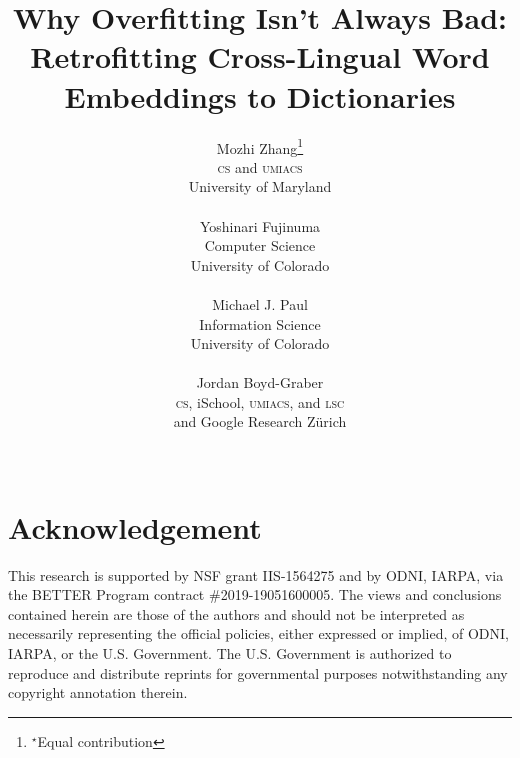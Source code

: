 \documentclass[11pt,a4paper]{article}
\title{Why Overfitting Isn't Always Bad: \\
Retrofitting Cross-Lingual Word Embeddings to Dictionaries}
\author{Mozhi Zhang\thanks{$^\star$Equal contribution} \\
  \textsc{cs} and \textsc{umiacs} \\
  University of Maryland \\
  \emaillink{mozhi@cs.umd.edu} \\\And
  Yoshinari Fujinuma\footnotemark[1] \\
  Computer Science \\
  University of Colorado \\
  \emaillink{fujinumay@gmail.com} \\\AND
  Michael J. Paul \\
  Information Science \\
  University of Colorado \\
  \emaillink{mpaul@colorado.edu} \\\And
  Jordan Boyd-Graber \\
  \abr{umd} \textsc{cs}, iSchool, \textsc{umiacs}, and \textsc{lsc}  \\
  and Google Research Z\"urich \\
  \emaillink{jbg@boydgraber.org} \\}
\date{}
\newcommand{\latexfile}[1]{}
\begin{document}
\maketitle
\begin{abstract}
  \latexfile{00-abstract}
\end{abstract}

\latexfile{10-intro}
\latexfile{20-clwe}
\latexfile{30-retrofit}
\latexfile{40-experiment}
\latexfile{50-related_work}
\latexfile{60-conclusion}

\section*{Acknowledgement}

This research is supported by NSF grant IIS-1564275 and by ODNI, IARPA, via the
BETTER Program contract \#2019-19051600005.
The views and conclusions contained herein are those of the authors and should
not be interpreted as necessarily representing the official policies, either
expressed or implied, of ODNI, IARPA, or the U.S. Government. The U.S.
Government is authorized to reproduce and distribute reprints for governmental
purposes notwithstanding any copyright annotation therein.

\clearpage



\end{document}

